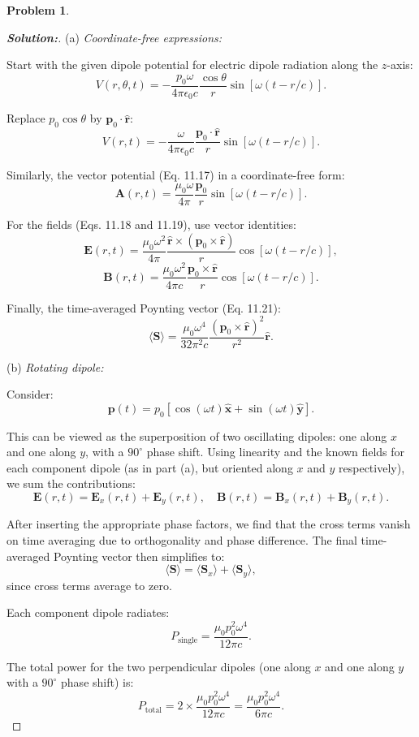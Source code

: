 \documentclass[12pt]{article}
\theoremstyle{definition}\newtheorem{problem}{Problem}
\newenvironment{solution}{\begin{proof}[\bfseries\textup{Solution:}]}{\end{proof}}
\begin{document}
\newpage
\begin{problem}
\end{problem}
\begin{solution}



\noindent (a) \emph{Coordinate-free expressions:}

Start with the given dipole potential for electric dipole radiation along the $z$-axis:
\[
V(r,\theta,t) = -\frac{p_0 \omega}{4\pi \epsilon_0 c}\frac{\cos\theta}{r}\sin[\omega(t - r/c)].
\]

Replace $p_0 \cos\theta$ by $\mathbf{p}_0 \cdot \hat{\mathbf{r}}$:
\[
V(r,t) = -\frac{\omega}{4\pi \epsilon_0 c}\frac{\mathbf{p}_0 \cdot \hat{\mathbf{r}}}{r}\sin[\omega(t - r/c)].
\]

Similarly, the vector potential (Eq. 11.17) in a coordinate-free form:
\[
\mathbf{A}(r,t) = \frac{\mu_0 \omega}{4\pi}\frac{\mathbf{p}_0}{r}\sin[\omega(t - r/c)].
\]

For the fields (Eqs. 11.18 and 11.19), use vector identities:
\[
\mathbf{E}(r,t) = \frac{\mu_0 \omega^2}{4\pi}\frac{\hat{\mathbf{r}}\times(\mathbf{p}_0\times \hat{\mathbf{r}})}{r}\cos[\omega(t - r/c)],
\]
\[
\mathbf{B}(r,t) = \frac{\mu_0 \omega^2}{4\pi c}\frac{\mathbf{p}_0\times\hat{\mathbf{r}}}{r}\cos[\omega(t - r/c)].
\]

Finally, the time-averaged Poynting vector (Eq. 11.21):
\[
\langle\mathbf{S}\rangle = \frac{\mu_0 \omega^4}{32\pi^2 c}\frac{(\mathbf{p}_0 \times \hat{\mathbf{r}})^2}{r^2}\hat{\mathbf{r}}.
\]


\noindent (b) \emph{Rotating dipole:}

Consider:
\[
\mathbf{p}(t) = p_0[\cos(\omega t)\hat{\mathbf{x}} + \sin(\omega t)\hat{\mathbf{y}}].
\]

This can be viewed as the superposition of two oscillating dipoles: one along $x$ and one along $y$, with a $90^\circ$ phase shift. Using linearity and the known fields for each component dipole (as in part (a), but oriented along $x$ and $y$ respectively), we sum the contributions:
\[
\mathbf{E}(r,t) = \mathbf{E}_x(r,t) + \mathbf{E}_y(r,t), \quad
\mathbf{B}(r,t) = \mathbf{B}_x(r,t) + \mathbf{B}_y(r,t).
\]

After inserting the appropriate phase factors, we find that the cross terms vanish on time averaging due to orthogonality and phase difference. The final time-averaged Poynting vector then simplifies to:
\[
\langle \mathbf{S}\rangle = \langle \mathbf{S}_x \rangle + \langle \mathbf{S}_y \rangle,
\]
since cross terms average to zero.

Each component dipole radiates:
\[
P_{\text{single}} = \frac{\mu_0 p_0^2 \omega^4}{12\pi c}.
\]

The total power for the two perpendicular dipoles (one along $x$ and one along $y$ with a $90^\circ$ phase shift) is:
\[
P_{\text{total}} = 2 \times \frac{\mu_0 p_0^2 \omega^4}{12\pi c} = \frac{\mu_0 p_0^2 \omega^4}{6\pi c}.
\]





\end{solution}
\end{document}
